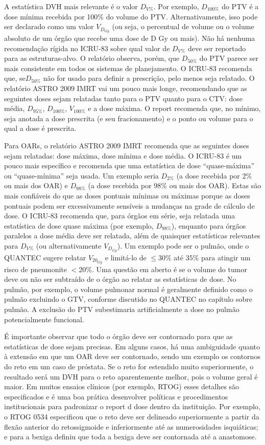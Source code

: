 \documentclass[11pt,a4paper]{article}
\newcounter{exemplo}
\begin{document}
	A estatística DVH mais relevante é o valor $D_{V\%}$. Por exemplo,  $D_{100\%}$ do PTV é a dose mínima recebida por 100\% do volume do PTV. Alternativamente, isso pode ser declarado como um valor $V_{D_{Gy}}$ (ou seja, o percentual de volume ou o volume absoluto de um órgão que recebe uma dose de D Gy ou mais). Não há nenhuma recomendação rígida no ICRU-83 sobre qual valor de $D_{V\%}$ deve ser reportado para as estruturas-alvo. O relatório observa, porém, que $D_{50\%}$ do PTV parece ser mais consistente em todos os sistemas de planejamento. O ICRU-83 recomenda que, se$D_{50\%}$ não for usado para definir a prescrição, pelo menos seja relatado. O relatório ASTRO 2009 IMRT vai um pouco mais longe, recomendando que as seguintes doses sejam relatadas tanto para o PTV quanto para o CTV: dose média, $D_{95\%}$, $D_{100\%}$, $V_{100\%}$ e a dose máxima. O report recomenda que, no mínimo, seja anotada a dose prescrita (e seu fracionamento) e o ponto ou volume para o qual a dose é prescrita.

	Para OARs, o relatório ASTRO 2009 IMRT recomenda que as seguintes doses sejam relatadas: dose máxima, dose mínima e dose média. O ICRU-83 é um pouco mais específico e recomenda que uma estatística de dose “quase-máxima” ou “quase-mínima” seja usada. Um exemplo seria $D_{2\%}$ (a dose recebida por 2\% ou mais dos OAR) e $D_{98\%}$ (a dose recebida por 98\% ou mais dos OAR). Estas são mais confiáveis do que as doses pontuais mínimas ou máximas porque as doses pontuais podem ser excessivamente sensíveis a mudanças na grade de cálculo de dose. O ICRU-83 recomenda que, para órgãos em série, seja relatada uma estatística de dose quase máxima (por exemplo, $D_{98\%}$), enquanto para órgãos paralelos a dose média deve ser relatada, além de quaisquer estatísticas relevantes para $D_{V\%}$ (ou alternativamente $V_{D_{Gy}}$). Um exemplo pode ser o pulmão, onde o QUANTEC sugere relatar $V_{20_{Gy}}$ e limitá-lo de $\leq 30\%$ até $35\%$ para atingir um risco de pneumonite $<$20\%. Uma questão em aberto é se o volume do tumor deve ou não ser subtraído de o órgão ao relatar as estatísticas de dose. No pulmão, por exemplo, o volume pulmonar normal é geralmente definido como o pulmão excluindo o GTV, conforme discutido no QUANTEC no capítulo sobre pulmão. A exclusão do PTV subestimaria artificialmente a dose no pulmão potencialmente funcional.

	É importante observar que todo o órgão deve ser contornado para que as estatísticas de dose sejam precisas. Em alguns casos, há uma ambiguidade quanto à extensão em que um OAR deve ser contornado, sendo um exemplo os contornos do reto em um caso de próstata. Se o reto for estendido muito superiormente, o resultado será um DVH para o reto aparentemente melhor, pois o volume geral é maior. Em muitos ensaios clínicos (por exemplo, RTOG) esses detalhes são especificados e é uma boa prática desenvolver políticas e procedimentos institucionais para padronizar o report d dose dentro da instituição. Por exemplo, o RTOG 0534 especificou que o reto deve ser delineado superiormente a partir da flexão anterior do retossigmoide e  inferiormente até as numerosidades isquiáticas; e para a bexiga definiu que toda a bexiga deve ser contornada até a anastomose.
\end{document}
